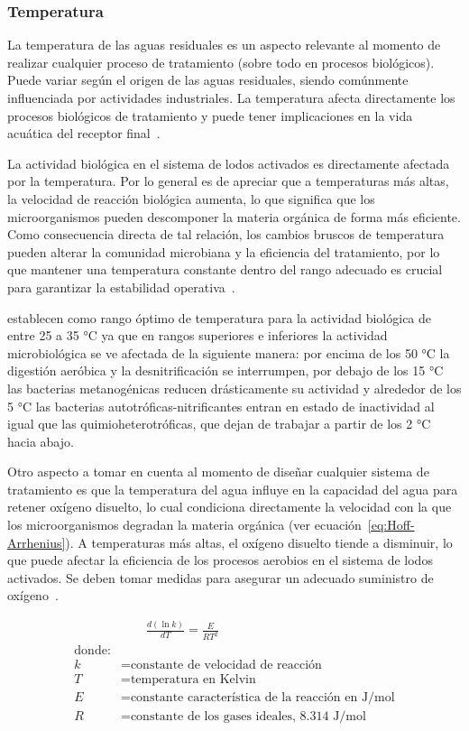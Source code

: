 \subsubsection{Temperatura}
La temperatura de las aguas residuales es un aspecto relevante al momento de realizar cualquier proceso de tratamiento (sobre todo en procesos biológicos). Puede variar según el origen de las aguas residuales, siendo comúnmente influenciada por actividades industriales. La temperatura afecta directamente los procesos biológicos de tratamiento y puede tener implicaciones en la vida acuática del receptor final~\citep{lazcano2016}.\par
La actividad biológica en el sistema de lodos activados es directamente afectada por la temperatura. Por lo general es de apreciar que a temperaturas más altas, la velocidad de reacción biológica aumenta, lo que significa que los microorganismos pueden descomponer la materia orgánica de forma más eficiente. Como consecuencia directa de tal relación, los cambios bruscos de temperatura pueden alterar la comunidad microbiana y la eficiencia del tratamiento, por lo que mantener una temperatura constante dentro del rango adecuado es crucial para garantizar la estabilidad operativa~\citep{delgadillo2005}.\par
\cite{metcalf2003} establecen como rango óptimo de temperatura para la actividad biológica de entre 25 a 35 °C ya que en rangos superiores e inferiores la actividad microbiológica se ve afectada de la siguiente manera: por encima de los 50 °C la digestión aeróbica y la desnitrificación se interrumpen, por debajo de los 15 °C las bacterias metanogénicas reducen drásticamente su actividad y alrededor de los 5 °C las bacterias autotróficas-nitrificantes entran en estado de inactividad al igual que las quimioheterotróficas, que dejan de trabajar a partir de los 2 °C hacia abajo.\par
Otro aspecto a tomar en cuenta al momento de diseñar cualquier sistema de tratamiento es que la temperatura del agua influye en la capacidad del agua para retener oxígeno disuelto, lo cual condiciona directamente la velocidad con la que los microorganismos degradan la materia orgánica (ver ecuación~\ref{eq:Hoff-Arrhenius}). A temperaturas más altas, el oxígeno disuelto tiende a disminuir, lo que puede afectar la eficiencia de los procesos aerobios en el sistema de lodos activados. Se deben tomar medidas para asegurar un adecuado suministro de oxígeno~\citep{crites2000,serway2007}.\par
\begin{equation} \label{eq:Hoff-Arrhenius}
	\begin{split}
		&\qquad\frac{d(\ln{k})}{dT} = \frac{E}{RT^2}\\
			\text{donde:} \\
			k& = \text{constante de velocidad de reacción}\\
			T& = \text{temperatura en Kelvin}\\
			E& = \text{constante característica de la reacción en J/mol}\\
			R& = \text{constante de los gases ideales, 8.314 J/mol}
	\end{split}
\end{equation}

